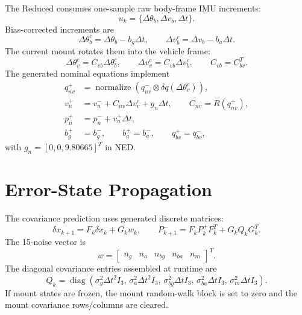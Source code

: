 \documentclass[11pt]{article}
\newcommand{\T}{^{T}}
\newcommand{\dq}{\delta q}
\newcommand{\dt}{\Delta t}
\begin{document}
The Reduced consumes one-sample raw body-frame IMU increments:
\begin{equation}
  u_k = \{\Delta\theta_b,\Delta v_b,\dt\}.
\end{equation}
Bias-corrected increments are
\begin{equation}
  \Delta\theta_b^c=\Delta\theta_b-b_g\dt,\qquad
  \Delta v_b^c=\Delta v_b-b_a\dt .
\end{equation}
The current mount rotates them into the vehicle frame:
\begin{equation}
  \Delta\theta_v^c=C_{vb}\Delta\theta_b^c,\qquad
  \Delta v_v^c=C_{vb}\Delta v_b^c,\qquad C_{vb}=C_{bv}\T .
\end{equation}
The generated nominal equations implement
\begin{align}
  q_{nv}^{+} &= \operatorname{normalize}\left(q_{nv}^{-}\otimes
  \dq(\Delta\theta_v^c)\right),\\
  v_n^{+} &= v_n^{-}+C_{nv}\Delta v_v^c+g_n\dt,\qquad
  C_{nv}=R(q_{nv}^{+}),\\
  p_n^{+} &= p_n^{-}+v_n^{+}\dt,\\
  b_g^{+}&=b_g^{-},\qquad b_a^{+}=b_a^{-},\qquad q_{bv}^{+}=q_{bv}^{-},
\end{align}
with \(g_n=[0,0,9.80665]\T\) in NED.

\section{Error-State Propagation}

The covariance prediction uses generated discrete matrices:
\begin{equation}
  \delta x_{k+1}=F_k\delta x_k+G_kw_k,
  \qquad
  P_{k+1}^{-}=F_kP_k^{+}F_k\T+G_kQ_kG_k\T .
\end{equation}
The 15-noise vector is
\begin{equation}
  w=
  \begin{bmatrix}
  n_g & n_a & n_{bg} & n_{ba} & n_m
  \end{bmatrix}\T .
\end{equation}
The diagonal covariance entries assembled at runtime are
\begin{equation}
  Q_k=\operatorname{diag}\left(
  \sigma_g^2\dt^2 I_3,\,
  \sigma_a^2\dt^2 I_3,\,
  \sigma_{bg}^2\dt I_3,\,
  \sigma_{ba}^2\dt I_3,\,
  \sigma_m^2\dt I_3
  \right).
\end{equation}
If mount states are frozen, the mount random-walk block is set to zero
and the mount covariance rows/columns are cleared.
\end{document}
